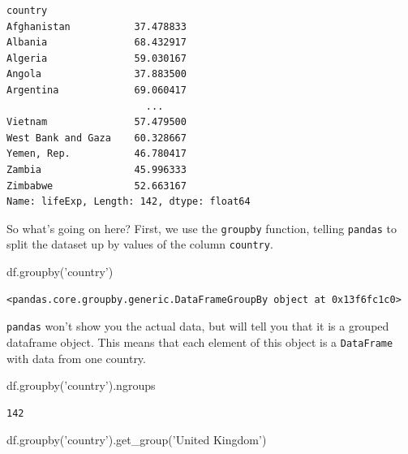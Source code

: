 \documentclass[
  letterpaper,
]{scrbook}
\newenvironment{Shaded}{\begin{snugshade}}{\end{snugshade}}
\newcommand{\NormalTok}[1]{#1}
\newcommand{\StringTok}[1]{\textcolor[rgb]{0.31,0.60,0.02}{#1}}
\begin{document}
\begin{verbatim}
country
Afghanistan           37.478833
Albania               68.432917
Algeria               59.030167
Angola                37.883500
Argentina             69.060417
                        ...    
Vietnam               57.479500
West Bank and Gaza    60.328667
Yemen, Rep.           46.780417
Zambia                45.996333
Zimbabwe              52.663167
Name: lifeExp, Length: 142, dtype: float64
\end{verbatim}

So what's going on here? First, we use the \texttt{groupby} function, telling \texttt{pandas} to split the dataset up by values of the column \texttt{country}.

\begin{Shaded}
\begin{Highlighting}[]
\NormalTok{df.groupby(}\StringTok{'country'}\NormalTok{)}
\end{Highlighting}
\end{Shaded}

\begin{verbatim}
<pandas.core.groupby.generic.DataFrameGroupBy object at 0x13f6fc1c0>
\end{verbatim}

\texttt{pandas} won't show you the actual data, but will tell you that it is a grouped dataframe object. This means that each element of this object is a \texttt{DataFrame} with data from one country.

\begin{Shaded}
\begin{Highlighting}[]
\NormalTok{df.groupby(}\StringTok{'country'}\NormalTok{).ngroups}
\end{Highlighting}
\end{Shaded}

\begin{verbatim}
142
\end{verbatim}

\begin{Shaded}
\begin{Highlighting}[]
\NormalTok{df.groupby(}\StringTok{'country'}\NormalTok{).get_group(}\StringTok{'United Kingdom'}\NormalTok{)}
\end{Highlighting}
\end{Shaded}
\end{document}
